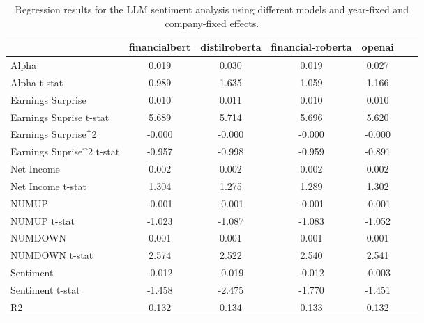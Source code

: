 \begin{table}
\caption{Regression results for the LLM sentiment analysis using different models and year-fixed and company-fixed effects.}
\label{tab:llm_regressions_cy_fixed}
\begin{tabular}{lcccccc}
\toprule
 & financialbert & distilroberta & financial-roberta & openai \\
\midrule
Alpha & 0.019 & 0.030 & 0.019 & 0.027 \\
Alpha t-stat & 0.989 & 1.635 & 1.059 & 1.166 \\
Earnings Surprise & 0.010 & 0.011 & 0.010 & 0.010 \\
Earnings Suprise t-stat & 5.689 & 5.714 & 5.696 & 5.620 \\
Earnings Surprise^2 & -0.000 & -0.000 & -0.000 & -0.000 \\
Earnings Suprise^2 t-stat & -0.957 & -0.998 & -0.959 & -0.891 \\
Net Income & 0.002 & 0.002 & 0.002 & 0.002 \\
Net Income t-stat & 1.304 & 1.275 & 1.289 & 1.302 \\
NUMUP & -0.001 & -0.001 & -0.001 & -0.001 \\
NUMUP t-stat & -1.023 & -1.087 & -1.083 & -1.052 \\
NUMDOWN & 0.001 & 0.001 & 0.001 & 0.001 \\
NUMDOWN t-stat & 2.574 & 2.522 & 2.540 & 2.541 \\
Sentiment & -0.012 & -0.019 & -0.012 & -0.003 \\
Sentiment t-stat & -1.458 & -2.475 & -1.770 & -1.451 \\
R2 & 0.132 & 0.134 & 0.133 & 0.132 \\
\bottomrule
\end{tabular}
\end{table}
